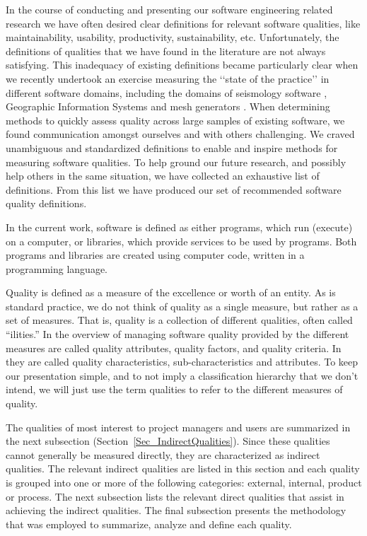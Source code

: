 \documentclass[letterpaper, cleveref]{lipics-v2019}
\theoremstyle{definition}
\begin{document}
In the course of conducting and presenting our software engineering related
research we have often desired clear definitions for relevant software
qualities, like maintainability, usability, productivity, sustainability, etc.
Unfortunately, the definitions of qualities that we have found in the literature
are not always satisfying.  This inadequacy of existing definitions became
particularly clear when we recently undertook an exercise measuring the
\lq\lq{}state of the practice\rq\rq{} in different software domains, including
the domains of seismology software \citep{SmithEtAl2018}, Geographic Information
Systems \citep{SmithEtAl2018_arXivGIS} and mesh generators
\citep{smith2016state}. When determining methods to quickly assess quality
across large samples of existing software, we found communication amongst
ourselves and with others challenging. We craved unambiguous and standardized
definitions to enable and inspire methods for measuring software qualities.  To
help ground our future research, and possibly help others in the same situation,
we have collected an exhaustive list of definitions.  From this list we have
produced our set of recommended software quality definitions.  

In the current work, software is defined as either programs, which run (execute)
on a computer, or libraries, which provide services to be used by programs. Both
programs and libraries are created using computer code, written in a programming
language.

Quality is defined as a measure of the excellence or worth of an entity.  As is
standard practice, we do not think of quality as a single measure, but rather as
a set of measures.  That is, quality is a collection of different qualities,
often called ``ilities.''  In the overview of managing software quality provided
by \citet[p.~110]{VanVliet2000} the different measures are called quality
attributes, quality factors, and quality criteria.  In \citet{ISO9126} they are
called quality characteristics, sub-characteristics and attributes.  To keep our
presentation simple, and to not imply a classification hierarchy that we don't
intend, we will just use the term qualities to refer to the different measures
of quality.

The qualities of most interest to project managers and users are summarized in
the next subsection (Section~\ref{Sec_IndirectQualities}).  Since these
qualities cannot generally be measured directly, they are characterized as
indirect qualities. The relevant indirect qualities are listed in this section
and each quality is grouped into one or more of the following categories:
external, internal, product or process. The next subsection lists the relevant
direct qualities that assist in achieving the indirect qualities.  The final
subsection presents the methodology that was employed to summarize, analyze and
define each quality.
\end{document}
